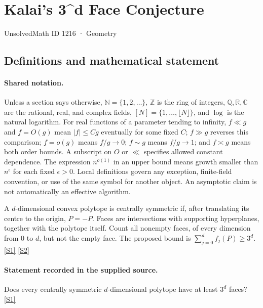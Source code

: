 \documentclass[11pt,a4paper]{article}
\newcommand{\N}{\mathbb{N}}
\newcommand{\Z}{\mathbb{Z}}
\newcommand{\Q}{\mathbb{Q}}
\newcommand{\R}{\mathbb{R}}
\newcommand{\C}{\mathbb{C}}
\newcommand{\sref}[2]{\hyperlink{source:#1:#2}{[S#2]}}
\begin{document}

\setcounter{section}{1215}

\section{Kalai's 3\textasciicircum{}d Face Conjecture}\label{1216}

{\small\sffamily UnsolvedMath ID 1216 · Geometry}

\subsection{Definitions and mathematical statement}

\paragraph{Shared notation.}Unless a section says otherwise, $\N=\{1,2,\ldots\}$,
$\Z$ is the ring of integers, $\Q,\R,\C$ are the rational, real, and complex
fields, $[N]=\{1,\ldots,\lfloor N\rfloor\}$, and $\log$ is the natural
logarithm. For real functions of a parameter tending to infinity,
$f\ll g$ and $f=O(g)$ mean $|f|\leq Cg$ eventually for some fixed $C$;
$f\gg g$ reverses this comparison; $f=o(g)$ means $f/g\to0$;
$f\sim g$ means $f/g\to1$; and $f\asymp g$ means both order bounds.
A subscript on $O$ or $\ll$ specifies allowed constant dependence.
The expression $n^{o(1)}$ in an upper bound means growth smaller than
$n^\epsilon$ for each fixed $\epsilon>0$. Local definitions govern any
exception, finite-field convention, or use of the same symbol for another
object. An asymptotic claim is not automatically an effective algorithm.



A $d$-dimensional convex polytope is centrally symmetric if, after translating its centre to the origin, $P=-P$. Faces are intersections with supporting hyperplanes, together with the polytope itself. Count all nonempty faces, of every dimension from 0 to $d$, but not the empty face. The proposed bound is $\sum_{j=0}^{d}f_j(P)\geq3^d$. \sref{1216}{1} \sref{1216}{2}

\paragraph{Statement recorded in the supplied source.}
Does every centrally symmetric $d$-dimensional polytope have at least $3^d$ faces? \sref{1216}{1}
\end{document}
